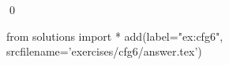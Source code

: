 
\begin{ex} 
  \label{ex:cfg6}
  
  \qed
\end{ex} 
\begin{python0}
from solutions import *
add(label="ex:cfg6",
    srcfilename='exercises/cfg6/answer.tex') 
\end{python0}
